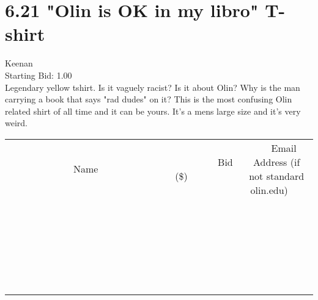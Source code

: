 \documentclass[11pt]{article}
\begin{document}
					\section*{6.21 "Olin is OK in my libro" T-shirt}
					Keenan \\
					Starting Bid: 1.00 \\
					Legendary yellow tshirt. Is it vaguely racist? Is it about Olin? Why is the man carrying a book that says "rad dudes" on it? This is the most confusing Olin related shirt of all time and it can be yours. It's a mens large size and it's very weird. \\
					[6ex]
					\begin{tabular}{c c c}
						~~~~~~~~~~~~~Name~~~~~~~~~~~~~ & ~~~~~~~~~Bid (\$)~~~~~~~~~ & ~~~Email Address (if not standard olin.edu)~~~ \\
				
 & & \\
\hline
 & & \\
\hline
 & & \\
\hline
 & & \\
\hline
 & & \\
\hline
 & & \\
\hline
 & & \\
\hline
 & & \\
\hline
 & & \\
\hline
 & & \\
\hline
 & & \\
\hline
 & & \\
\hline
 & & \\
\hline
 & & \\
\hline
 & & \\
\hline
 & & \\
\hline
 & & \\
\hline
 & & \\
\hline
 & & \\
\hline
 & & \\
\hline
 & & \\
\hline
 & & \\
\hline
 & & \\
\hline
 & & \\
\hline
 & & \\
\hline
 & & \\
\hline
					\end{tabular}
					\clearpage
				
\end{document}
